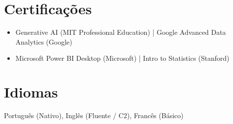 \documentclass[10pt,a4paper]{article}
\begin{document}
\section*{Certificações}

\begin{itemize}
  \item Generative AI (MIT Professional Education) | Google Advanced Data Analytics (Google)
  \item Microsoft Power BI Desktop (Microsoft) | Intro to Statistics (Stanford)
\end{itemize}

\section*{Idiomas}

Português (Nativo), Inglês (Fluente / C2), Francês (Básico)
\end{document}
